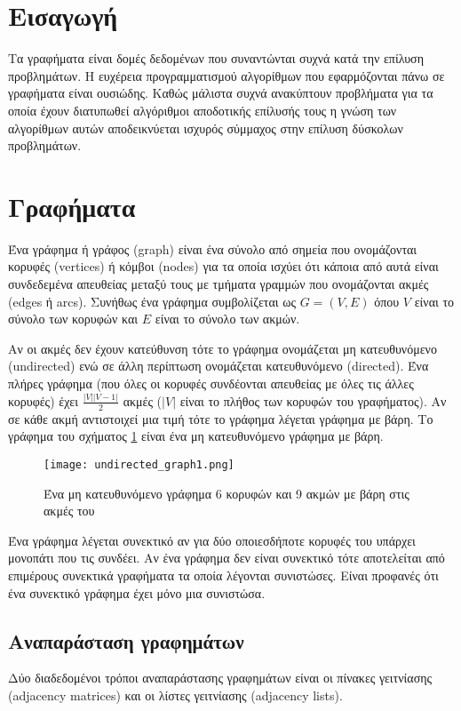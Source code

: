 \section{Εισαγωγή}
Τα γραφήματα είναι δομές δεδομένων που συναντώνται συχνά κατά την επίλυση προβλημάτων. Η ευχέρεια προγραμματισμού αλγορίθμων που εφαρμόζονται πάνω σε γραφήματα είναι ουσιώδης. Καθώς μάλιστα συχνά ανακύπτουν προβλήματα για τα οποία έχουν διατυπωθεί αλγόριθμοι αποδοτικής επίλυσής τους η γνώση των αλγορίθμων αυτών αποδεικνύεται ισχυρός σύμμαχος στην επίλυση δύσκολων προβλημάτων. 

\section{Γραφήματα}
Ένα γράφημα ή γράφος (graph) είναι ένα σύνολο από σημεία που ονομάζονται κορυφές (vertices) ή κόμβοι (nodes) για τα οποία ισχύει ότι κάποια από αυτά είναι συνδεδεμένα απευθείας μεταξύ τους με τμήματα γραμμών που ονομάζονται ακμές (edges ή arcs). Συνήθως ένα γράφημα συμβολίζεται ως $G=(V,E)$ όπου $V$ είναι το σύνολο των κορυφών και $E$ είναι το σύνολο των ακμών.

Αν οι ακμές δεν έχουν κατεύθυνση τότε το γράφημα ονομάζεται μη κατευθυνόμενο (undirected) ενώ σε άλλη περίπτωση ονομάζεται κατευθυνόμενο (directed). Ένα πλήρες γράφημα (που όλες οι κορυφές συνδέονται απευθείας με όλες τις άλλες κορυφές) έχει $\frac{|V||V-1|}{2}$ ακμές ($|V|$ είναι το πλήθος των κορυφών του γραφήματος). Αν σε κάθε ακμή αντιστοιχεί μια τιμή τότε το γράφημα λέγεται γράφημα με βάρη. Το γράφημα του σχήματος \ref{fig:undirected_graph1} είναι ένα μη κατευθυνόμενο γράφημα με βάρη. 

\begin{figure}[ht]
	\centering
	\texttt{[image: undirected\_graph1.png]}
	\caption{Ένα μη κατευθυνόμενο γράφημα 6 κορυφών και 9 ακμών με βάρη στις ακμές του}
	\label{fig:undirected_graph1}
\end{figure}

Ένα γράφημα λέγεται συνεκτικό αν για δύο οποιεσδήποτε κορυφές του υπάρχει μονοπάτι που τις συνδέει. Αν ένα γράφημα δεν είναι συνεκτικό τότε αποτελείται από επιμέρους συνεκτικά γραφήματα τα οποία λέγονται συνιστώσες. Είναι προφανές ότι ένα συνεκτικό γράφημα έχει μόνο μια συνιστώσα.

\subsection{Αναπαράσταση γραφημάτων}
Δύο διαδεδομένοι τρόποι αναπαράστασης γραφημάτων είναι οι πίνακες γειτνίασης (adjacency matrices) και οι λίστες γειτνίασης (adjacency lists).

